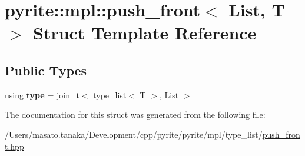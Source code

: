 \hypertarget{structpyrite_1_1mpl_1_1push__front}{}\section{pyrite\+:\+:mpl\+:\+:push\+\_\+front$<$ List, T $>$ Struct Template Reference}
\label{structpyrite_1_1mpl_1_1push__front}
\subsection*{Public Types}
\begin{DoxyCompactItemize}
\item 
\mbox{\label{structpyrite_1_1mpl_1_1push__front_a5cfea53f49a9f5644336d04c321aef97}} 
using {\bfseries type} = join\+\_\+t$<$ \mbox{\hyperlink{structpyrite_1_1core_1_1mpl_1_1type__list}{type\+\_\+list}}$<$ T $>$, List $>$
\end{DoxyCompactItemize}


The documentation for this struct was generated from the following file\+:\begin{DoxyCompactItemize}
\item 
/\+Users/masato.\+tanaka/\+Development/cpp/pyrite/pyrite/mpl/type\+\_\+list/\mbox{\hyperlink{push__front_8hpp}{push\+\_\+front.\+hpp}}\end{DoxyCompactItemize}
